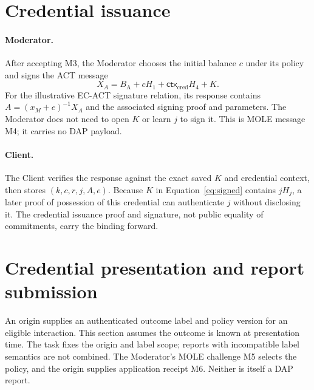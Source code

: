 \documentclass[11pt]{article}
\begin{document}
\section{Credential issuance}

\paragraph{Moderator.}
After accepting M3, the Moderator chooses the initial
balance $c$ under its policy and signs the ACT message
\begin{equation}
  X_A=B_{\mathrm A}+cH_1+\mathsf{ctx}_{\mathrm{cred}}H_4+K.
  \label{eq:signed}
\end{equation}
For the illustrative EC-ACT signature relation, its response contains
$A=(x_M+e)^{-1}X_A$ and the associated signing proof and parameters. The
Moderator does not need to open $K$ or learn $j$ to sign it. This is
MOLE message M4; it carries no DAP payload.

\paragraph{Client.}
The Client verifies the response against the exact saved $K$ and credential
context, then stores $(k,c,r,j,A,e)$. Because $K$ in
Equation~\eqref{eq:signed} contains $jH_j$, a later proof of possession
of this credential can authenticate $j$ without disclosing it. The
credential issuance proof and signature, not public equality of
commitments, carry the binding forward.

\section{Credential presentation and report submission}

An origin supplies an authenticated outcome label and policy version for an
eligible interaction. This section assumes the outcome is known at
presentation time. The task fixes the origin and label scope; reports with
incompatible label semantics are not combined. The Moderator's MOLE
challenge M5 selects the policy, and the origin supplies application
receipt M6. Neither is itself a DAP report.
\end{document}
